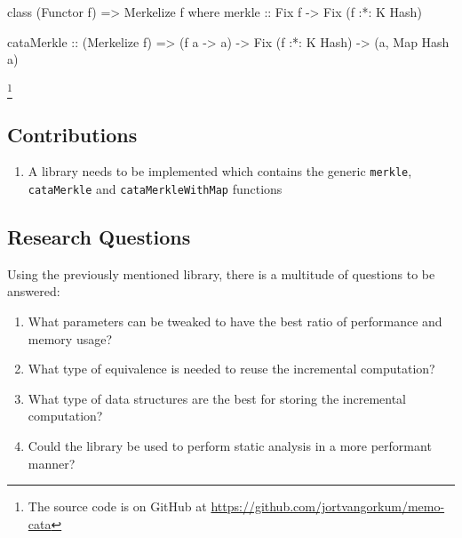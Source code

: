 \begin{haskell}
class (Functor f) => Merkelize f where
    merkle :: Fix f -> Fix (f :*: K Hash)
\end{haskell}

\begin{haskell}
cataMerkle :: (Merkelize f) => (f a -> a) -> Fix (f :*: K Hash) -> (a, Map Hash a)
\end{haskell}

\footnote{The source code is on GitHub at \hyperlink{https://github.com/jortvangorkum/memo-cata}{https://github.com/jortvangorkum/memo-cata}}

\subsection{Contributions}
\begin{enumerate}[label={(\Alph*)}]
    \item A library needs to be implemented which contains the generic \texttt{merkle}, \texttt{cataMerkle} and \texttt{cataMerkleWithMap} functions
\end{enumerate}

\subsection{Research Questions}
Using the previously mentioned library, there is a multitude of questions to be answered:
\begin{enumerate}[label={(\Alph*)}]
    \item What parameters can be tweaked to have the best ratio of performance and memory usage?
    \item What type of equivalence is needed to reuse the incremental computation?
    \item What type of data structures are the best for storing the incremental computation?
    \item Could the library be used to perform static analysis in a more performant manner?
\end{enumerate}
